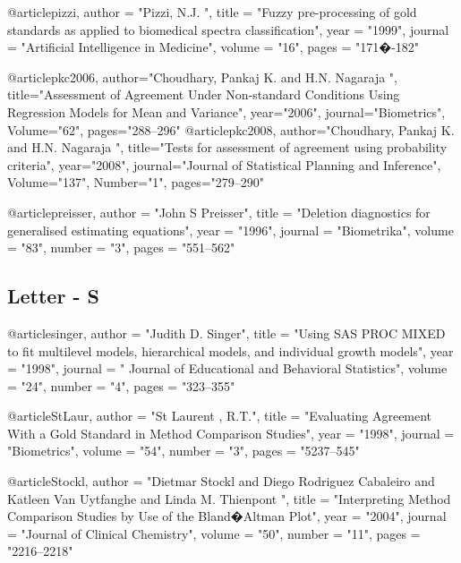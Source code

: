 @article{pizzi,
	author = "Pizzi, N.J. ",
	title = "Fuzzy pre-processing of gold standards as applied to biomedical spectra classification",
	year = "1999",
	journal = "Artificial Intelligence in Medicine",
	volume = "16",
	pages = "171�-182"
}

@article{pkc2006,
	author="Choudhary, Pankaj K. and H.N. Nagaraja ",
	title="Assessment of Agreement Under Non-standard Conditions Using
	Regression Models for Mean and Variance",
	year="2006",
	journal="Biometrics",
	Volume="62",
	pages="288--296"
}
@article{pkc2008,
	author="Choudhary, Pankaj K. and H.N. Nagaraja ",
	title="Tests for assessment of agreement using probability criteria",
	year="2008",
	journal="Journal of Statistical Planning and Inference",
	Volume="137",
	Number="1",
	pages="279--290"
}

@article{preisser,
	author = "John S Preisser",
	title = "Deletion diagnostics for generalised estimating equations",
	year = "1996",
	journal = "Biometrika",
	volume = "83",
	number = "3",
	pages = "551--562"
}

\subsection*{Letter - S}

@article{singer,
	author = "Judith D. Singer",
	title = "Using SAS PROC MIXED to fit multilevel models, hierarchical models, and individual growth models",
	year = "1998",
	journal = " Journal of Educational and Behavioral Statistics",
	volume = "24",
	number = "4",
	pages = "323--355"
}


@article{StLaur,
	author = "St Laurent , R.T.",
	title = "Evaluating Agreement With a Gold Standard in Method Comparison Studies",
	year = "1998",
	journal = "Biometrics",
	volume = "54",
	number = "3",
	pages = "5237--545"
}

@article{Stockl,
	author = "Dietmar Stockl and Diego Rodriguez Cabaleiro and Katleen Van Uytfanghe and Linda M. Thienpont ",
	title = "Interpreting Method Comparison Studies by Use of the Bland�Altman Plot",
	year = "2004",
	journal = "Journal of Clinical Chemistry",
	volume = "50",
	number = "11",
	pages = "2216--2218"
}
